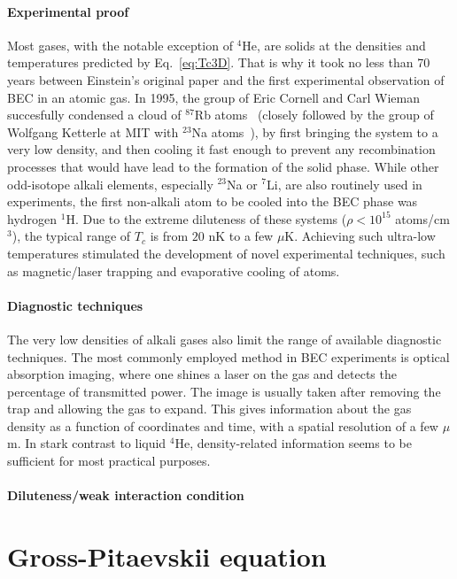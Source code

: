 \paragraph{Experimental proof}
Most gases, with the notable exception of ${}^4$He, are solids at the
densities and temperatures predicted by Eq.~\eqref{eq:Tc3D}. That is
why it took no less than 70 years between Einstein's original paper
and the first experimental observation of BEC in an atomic gas. In
1995, the group of Eric Cornell and Carl Wieman succesfully condensed
a cloud of ${}^{87}$Rb atoms~\cite{Anderson198} (closely followed by
the group of Wolfgang Ketterle at MIT with ${}^{23}$Na
atoms~\cite{PhysRevLett.75.3969}), by first bringing the system to a
very low density, and then cooling it fast enough to prevent any
recombination processes that would have lead to the formation of the
solid phase. While other odd-isotope alkali elements, especially
${}^{23}$Na or ${}^{7}$Li, are also routinely used in experiments, the
first non-alkali atom to be cooled into the BEC phase was hydrogen
${}^1$H. Due to the extreme diluteness of these systems
($\rho < 10^{15}$ atoms/cm${}^3$), the typical range of $T_c$ is from
$20$ nK to a few $\mu$K. Achieving such ultra-low temperatures
stimulated the development of novel experimental techniques, such as
magnetic/laser trapping and evaporative cooling of atoms.

\paragraph{Diagnostic techniques}
The very low densities of alkali gases also limit the range of
available diagnostic techniques. The most commonly employed method in
BEC experiments is optical absorption imaging, where one shines a
laser on the gas and detects the percentage of transmitted power. The
image is usually taken after removing the trap and allowing the gas to
expand. This gives information about the gas density as a function of
coordinates and time, with a spatial resolution of a few $\mu$m. In
stark contrast to liquid ${}^4$He, density-related information seems
to be sufficient for most practical purposes.

\paragraph{Diluteness/weak interaction condition}


\section{Gross-Pitaevskii equation}
\label{sec:GPE}

